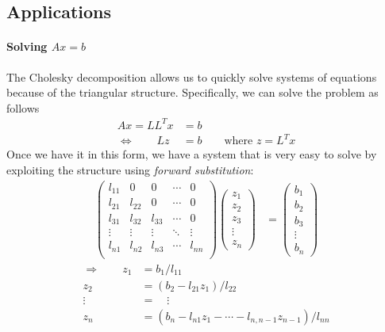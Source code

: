 \documentclass[12pt]{article}
\theoremstyle{plain}
\theoremstyle{definition}
\theoremstyle{remark}
\begin{document}
\subsection{Applications}

\paragraph{Solving $Ax=b$} The Cholesky decomposition allows us to
quickly solve systems of equations because of the triangular
structure. Specifically, we can solve the problem as follows
\begin{align*}
  Ax = LL^Tx&=b\\
  \Leftrightarrow \quad \quad Lz&=b \qquad \text{where }z = L^T x
\end{align*}
Once we have it in this form, we have a system that is very easy to
solve by exploiting the structure using \emph{forward substitution}:
\begin{align*}
  \begin{pmatrix}
    l_{11} & 0      & 0 & \cdots & 0 \\
    l_{21} & l_{22} & 0 & \cdots & 0\\
    l_{31} & l_{32} & l_{33}& \cdots & 0\\
    \vdots & \vdots & \vdots & \ddots & \vdots\\
    l_{n1} & l_{n2} & l_{n3} &\cdots & l_{nn}\\
  \end{pmatrix}
  \begin{pmatrix}
    z_1 \\ z_2 \\ z_3 \\ \vdots \\ z_n
  \end{pmatrix}
  &=
  \begin{pmatrix}
    b_1 \\ b_2 \\ b_3 \\ \vdots \\ b_n
  \end{pmatrix}
\end{align*}
\begin{align*}
  \Rightarrow \qquad
  z_1 &= b_1/l_{11} \\
  z_2 &= (b_2 - l_{21}z_1)/l_{22} \\
  \vdots \; &= \quad \vdots\\
  z_n &= (b_n - l_{n1}z_1 - \cdots - l_{n,n-1}z_{n-1})/l_{nn}
\end{align*}
\end{document}

